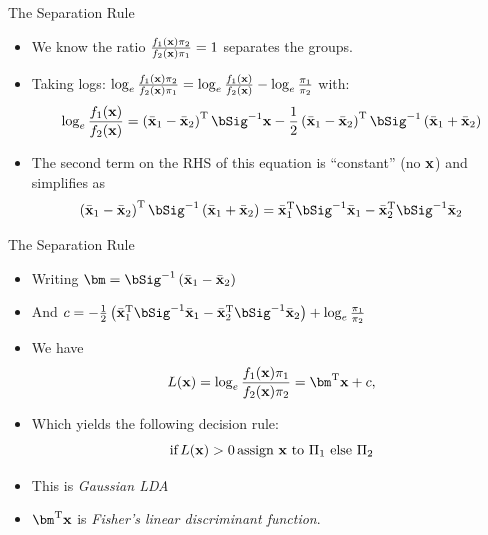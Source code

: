 \documentclass{beamer}
\begin{document}
\begin{frame}{The Separation Rule}
  \begin{itemize}
  \item We know the ratio $\frac{f_1(\mathbf{x})\pi_2}{f_2(\mathbf{x})\pi_1}=1$ separates the groups.
  \item Taking logs: $\log_e\frac{f_1(\mathbf{x})\pi_2}{f_2(\mathbf{x})\pi_1} = \log_e\frac{f_1(\mathbf{x})}{f_2(\mathbf{x})}-\log_e\frac{\pi_1}{\pi_2}$ with:
    \begin{equation*}
      \log_e\frac{f_1(\bx)}{f_2(\bx)} = \left(\bar\bx_1-\bar\bx_2\right)^\rT\bSig^{-1}\bx -\frac{1}{2}\left(\bar\bx_1-\bar\bx_2\right)^\rT\bSig^{-1}\left(\bar\bx_1+\bar\bx_2\right)\label{eq:logp1p2}
    \end{equation*}
  \item The second term on the RHS of this equation is ``constant'' (no $\mathbf{x}$) and simplifies as
    \begin{equation*}
      \left(\bar\bx_1-\bar\bx_2\right)^\rT\bSig^{-1}\left(\bar\bx_1+\bar\bx_2\right)  =\bar\bx_1^\rT\bSig^{-1}\bar\bx_1 - \bar\bx_2^\rT\bSig^{-1}\bar\bx_2
    \end{equation*}
  \end{itemize}
\end{frame}

\begin{frame}{The Separation Rule}
  \begin{itemize}
    \item Writing $\bm=\bSig^{-1} \left(\bar\bx_1-\bar\bx_2\right)$
    \item And $c = -\frac{1}{2}\left(\bar\bx_1^\rT\bSig^{-1}\bar\bx_1 - \bar\bx_2^\rT\bSig^{-1}\bar\bx_2\right)+\log_e\frac{\pi_1}{\pi_2}$
    \item We have
      \begin{equation*}
        L(\bx) = \log_e\frac{f_1(\bx)\pi_1}{f_2(\bx)\pi_2} = \bm^\rT\bx+c,\label{eq:lindisc}
      \end{equation*}
    \item Which yields the following decision rule:
      \begin{equation*}
        \mbox{if}\,L(\mathbf{x})>0\,\mbox{assign $\mathbf{x}$ to $\Pi_1$ else $\Pi_2$}
      \end{equation*}
    \item This is \textit{Gaussian LDA}
    \item $\bm^\rT\bx$ is \textit{Fisher's linear discriminant function}.
  \end{itemize}
\end{frame}
\end{document}

